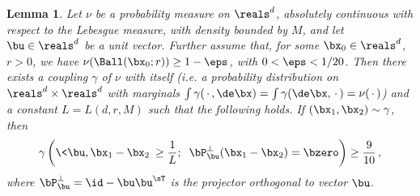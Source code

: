 \documentclass[11pt]{article}
\newtheorem{lemma}{Lemma}
\begin{document}
\begin{lemma}\label{lemma:Coupling}
Let $\nu$ be a probability measure on $\reals^d$, absolutely continuous with respect to the Lebesgue measure, 
with density bounded by $M$, and let $\bu\in\reals^d$ be a unit vector. Further assume that, for some $\bx_0\in\reals^d$, $r>0$,
we have $\nu(\Ball(\bx_0;r))\ge 1-\eps$, with $0< \eps<1/20$. Then there exists a coupling $\gamma$ of $\nu$
with itself (i.e. a probability distribution on $\reals^d\times \reals^d$ with marginals $\int \gamma(\,\cdot\,,\de\bx) =
\int \gamma(\de\bx,\,\cdot\,)=\nu(\,\cdot\,)$) and a constant $L = L(d,r,M)$ such that the following holds.  If $(\bx_1,\bx_2)\sim \gamma$, then
%
\begin{align}
%
\gamma\left(\<\bu,\bx_1-\bx_2\>\ge \frac{1}{L};\;\; \bP^{\perp}_{\bu} (\bx_1-\bx_2)=\bzero\right)\ge \frac{9}{10}\, ,\label{eq:Coupling}
%
\end{align}
%
where $\bP^{\perp}_{\bu}=\id-\bu\bu^{\sT}$ is the projector orthogonal to vector $\bu$.
\end{lemma}
%
\end{document}
